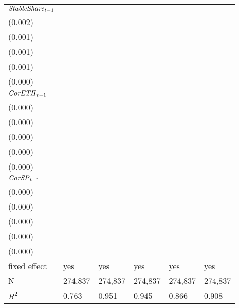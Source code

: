 \begin{tabular}{llllll}
${{\it StableShare}}_{t-1}$  &   \makecell{$0.093^{***}$ \\ (0.002)} &  \makecell{$-0.007^{***}$ \\ (0.001)} &  \makecell{$-0.007^{***}$ \\ (0.001)} &   \makecell{$0.024^{***}$ \\ (0.001)} &   \makecell{$0.008^{***}$ \\ (0.000)} \\
${{\it CorETH}}_{t-1}$       &  \makecell{$-0.001^{***}$ \\ (0.000)} &      \makecell{$0.000^{}$ \\ (0.000)} &      \makecell{$0.000^{}$ \\ (0.000)} &  \makecell{$-0.000^{***}$ \\ (0.000)} &  \makecell{$-0.000^{***}$ \\ (0.000)} \\
${{\it CorSP}}_{t-1}$        &     \makecell{$-0.000^{}$ \\ (0.000)} &    \makecell{$-0.000^{*}$ \\ (0.000)} &    \makecell{$-0.000^{*}$ \\ (0.000)} &   \makecell{$0.000^{***}$ \\ (0.000)} &   \makecell{$0.000^{***}$ \\ (0.000)} \\
\midrule fixed effect        &                                   yes &                                   yes &                                   yes &                                   yes &                                   yes \\
N                            &                               274,837 &                               274,837 &                               274,837 &                               274,837 &                               274,837 \\
$R^2$                        &                                 0.763 &                                 0.951 &                                 0.945 &                                 0.866 &                                 0.908 \\
\bottomrule
\end{tabular}
